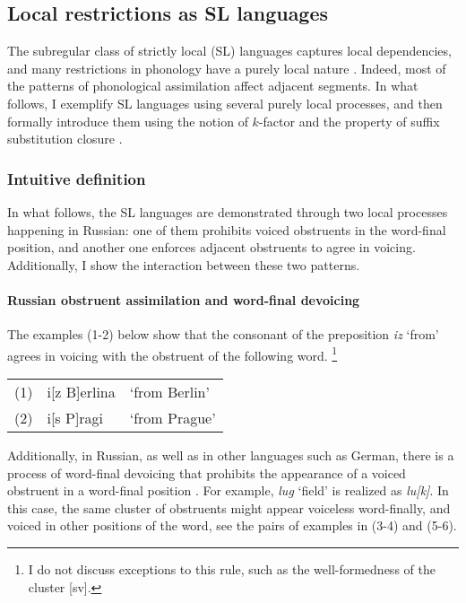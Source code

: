 \subsection{Local restrictions as SL languages}
\label{russianwfdpatternn}

The subregular class of strictly local (SL) languages captures local dependencies, and many restrictions in phonology have a purely local nature \citep{RogersPullum2011}.
Indeed, most of the patterns of phonological assimilation affect adjacent segments.
In what follows, I exemplify SL languages using several purely local processes, and then formally introduce them using the notion of $k$-factor and the property of suffix substitution closure \citep{RogersEtAl13}.

\subsubsection{Intuitive definition}

In what follows, the SL languages are demonstrated through two local processes happening in Russian: one of them prohibits voiced obstruents in the word-final position, and another one enforces adjacent obstruents to agree in voicing.
Additionally, I show the interaction between these two patterns.

\paragraph{Russian obstruent assimilation and word-final devoicing}
The examples (1-2) below show that the consonant of the preposition \emph{iz} `from' agrees in voicing with the obstruent of the following word.%
\footnote{I do not discuss exceptions to this rule, such as the well-formedness of the cluster [sv].}

\medskip
\begin{tabular}{lll}
(1) & i[z B]erlina & `from Berlin' \\
(2) & i[s P]ragi & `from Prague'
\end{tabular}
\medskip

Additionally, in Russian, as well as in other languages such as German, there is a process of word-final devoicing that prohibits the appearance of a voiced obstruent in a word-final position \citep{Wiebke1995,Padgett2002ms}.
For example, \emph{lug} `field' is realized as \emph{lu[k]}.
In this case, the same cluster of obstruents might appear voiceless word-finally, and voiced in other positions of the word, see the pairs of examples in (3-4) and (5-6).

